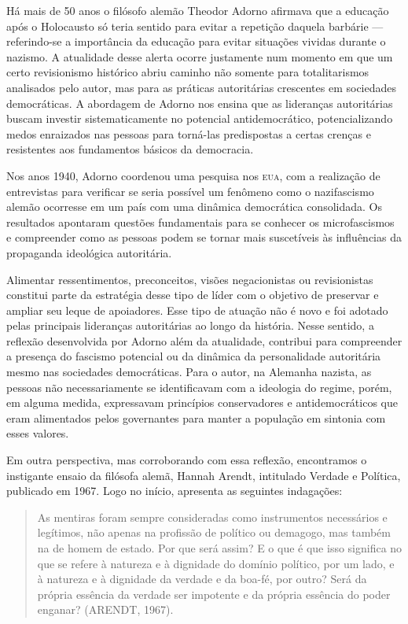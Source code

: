 Há mais de 50 anos o filósofo alemão Theodor Adorno afirmava que a
educação após o Holocausto só teria sentido para evitar a repetição
daquela barbárie --- referindo-se a importância da educação para evitar
situações vividas durante o nazismo. A atualidade desse alerta ocorre
justamente num momento em que um certo revisionismo histórico abriu
caminho não somente para totalitarismos analisados pelo autor, mas para
as práticas autoritárias crescentes em sociedades democráticas. A
abordagem de Adorno nos ensina que as lideranças autoritárias buscam
investir sistematicamente no potencial antidemocrático, potencializando
medos enraizados nas pessoas para torná-las predispostas a certas
crenças e resistentes aos fundamentos básicos da democracia.

Nos anos 1940, Adorno coordenou uma pesquisa nos \textsc{eua}, com a realização
de entrevistas para verificar se seria possível um fenômeno como o
nazifascismo alemão ocorresse em um país com uma dinâmica democrática
consolidada. Os resultados apontaram questões fundamentais para se
conhecer os microfascismos e compreender como as pessoas podem se tornar
mais suscetíveis às influências da propaganda ideológica autoritária.

Alimentar ressentimentos, preconceitos, visões negacionistas ou
revisionistas constitui parte da estratégia desse tipo de líder com o
objetivo de preservar e ampliar seu leque de apoiadores. Esse tipo de
atuação não é novo e foi adotado pelas principais lideranças
autoritárias ao longo da história. Nesse sentido, a reflexão
desenvolvida por Adorno além da atualidade, contribui para compreender a
presença do fascismo potencial ou da dinâmica da personalidade
autoritária mesmo nas sociedades democráticas. Para o autor, na Alemanha
nazista, as pessoas não necessariamente se identificavam com a ideologia
do regime, porém, em alguma medida, expressavam princípios conservadores
e antidemocráticos que eram alimentados pelos governantes para manter a
população em sintonia com esses valores.

Em outra perspectiva, mas corroborando com essa reflexão, encontramos o
instigante ensaio da filósofa alemã, Hannah Arendt, intitulado Verdade e
Política, publicado em 1967. Logo no início, apresenta as seguintes
indagações:

\begin{quote}
As mentiras foram sempre consideradas como instrumentos necessários e
legítimos, não apenas na profissão de político ou demagogo, mas também
na de homem de estado. Por que será assim? E o que é que isso significa
no que se refere à natureza e à dignidade do domínio político, por um
lado, e à natureza e à dignidade da verdade e da boa-fé, por outro? Será
da própria essência da verdade ser impotente e da própria essência do
poder enganar? (ARENDT, 1967).
\end{quote}

